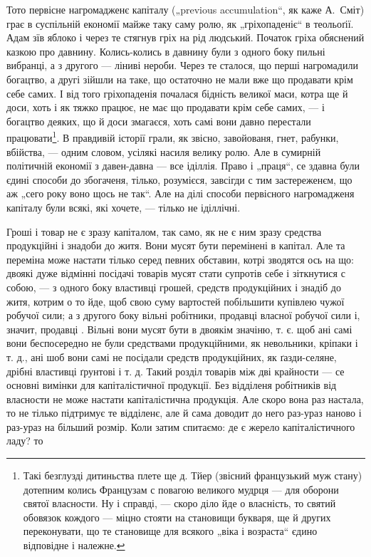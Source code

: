 Тото первісне нагромадженє капіталу („previous accumulation“,
як каже А.~Сміт) грає в суспільній економії
майже таку саму ролю, як „гріхопаденіє“ в теольоґії. Адам
зїв яблоко і через те стягнув гріх на рід людський. Початок
гріха обяснений казкою про давнину. Колись-колись
в давнину були з одного боку пильні вибранці, а з другого —
ліниві нероби. Через те сталося, що перші нагромадили
богацтво, а другі зійшли на таке, що остаточно не мали
вже що продавати крім себе самих. І від того гріхопаденія
почалася бідність великої маси, котра ще й доси, хоть і як
тяжко працює, не має що продавати крім себе самих, —
і богацтво деяких, що й доси змагаєся, хоть самі вони
давно перестали працювати\footnote{
Такі безглузді дитиньства плете ще д. Тйер (звісний французький
муж стану) дотепним колись Французам с повагою великого мудрця —
для оборони святої власности. Ну і справді, — скоро діло йде о власність,
то святий обовязок кождого — міцно стояти на становищи букваря,
ще й других переконувати, що те становище для всякого „віка
і возраста“ єдино відповідне і належне.
}. В правдивій історії грали, як
звісно, завойованя, гнет, рабунки, вбійства, — одним словом,
усілякі насиля велику ролю. Але в сумирній політичній
економії з давен-давна — все іділлія. Право і „праця“, се
здавна були єдині способи до збогаченя, тілько, розумієся,
завсігди с тим застереженєм, що аж „сего року воно щось
не так“. Але на ділі способи первісного нагромадженя капіталу
були всякі, які хочете, — тілько не іділлічні.

Гроші і товар не є зразу капіталом, так само, як не
є ним зразу средства продукційні і знадоби до житя. Вони
мусят бути перемінені в капітал. Але та переміна може настати
тілько серед певних обставин, котрі зводятся ось на
що: двоякі дуже відмінні посідачі товарів мусят стати супротів
себе і зіткнутися с собою, — з одного боку властивці
грошей, средств продукційних і знадіб до житя, котрим
о то йде, щоб свою суму вартостей побільшити купівлею
чужої робучої сили; а з другого боку вільні робітники, продавці
власної робучої сили і, значит, продавці .
Вільні вони мусят бути в двоякім значіню, т. є. щоб ані
самі вони беспосередно не були средствами продукційними,
як невольники, кріпаки і т. д., ані шоб вони самі не посідали
средств продукційних, як ґазди-селяне, дрібні властивці
ґрунтові і т. д. Такий розділ товарів між дві крайности
— се основні вимінки для капіталістичної продукції.
Без відділеня робітників від власности не може настати
капіталістична продукція. Але скоро вона раз настала, то
не тілько підтримує те відділенє, але й сама доводит до
него раз-ураз наново і раз-ураз на більший розмір. Коли
затим спитаємо: де є жерело капіталістичного ладу? то
\parbreak{}
